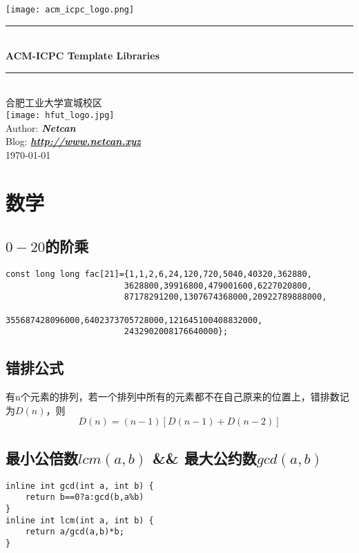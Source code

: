 \documentclass[a4paper]{ctexrep}
\newcommand{\HRule}{\rule{\linewidth}{0.5mm}} %
\begin{document}
\begin{titlepage}
\begin{center}
\texttt{[image: acm\_icpc\_logo.png]}\\[0.5cm]
\HRule\\[0.4cm]
{\huge \bfseries ACM-ICPC Template Libraries}\\[0.2cm] 
\HRule\\[1.5cm]
\textsc{\large 合肥工业大学宣城校区}\\[1cm]
\texttt{[image: hfut\_logo.jpg]}\\[0.5cm]
Author: \textbf{\emph{Netcan}}\\
Blog: \textbf{\emph{\url{http://www.netcan.xyz}}}\\
{\large \today}\\[2cm]
\end{center}
\end{titlepage}

\tableofcontents

\chapter{数学}
\section{$0-20$的阶乘}
\begin{lstlisting}
const long long fac[21]={1,1,2,6,24,120,720,5040,40320,362880,
						3628800,39916800,479001600,6227020800,
						87178291200,1307674368000,20922789888000,
						355687428096000,6402373705728000,121645100408832000,
						2432902008176640000};
\end{lstlisting}
\section{错排公式}
有n个元素的排列，若一个排列中所有的元素都不在自己原来的位置上，错排数记为$D(n)$，则
$$D(n) = (n-1)[D(n-1)+D(n-2)]$$
\section{最小公倍数$lcm(a,b)$ \&\& 最大公约数$gcd(a,b)$}
\begin{lstlisting}
inline int gcd(int a, int b) {
	return b==0?a:gcd(b,a%b)
}
inline int lcm(int a, int b) {
	return a/gcd(a,b)*b;
}
\end{lstlisting}
\end{document}
